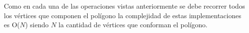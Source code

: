 Como en cada una de las operaciones vistas anteriormente se debe recorrer todos los vértices que componen el polígono la complejidad de estas implementaciones es O($N$) siendo $N$ la cantidad de vértices que conforman el polígono.